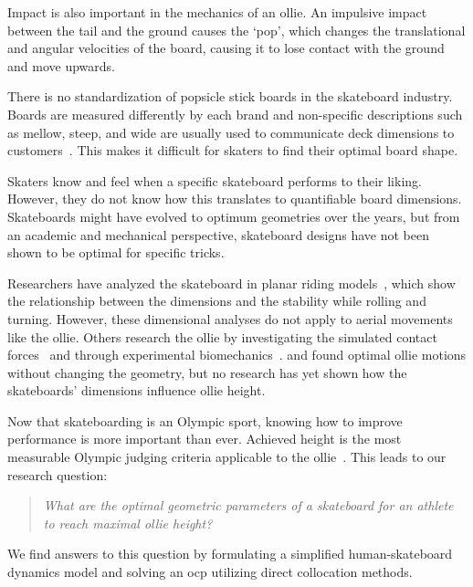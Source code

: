 \documentclass[default,iicol,pdflatex]{sn-jnl}
\begin{document}
Impact is also important in the mechanics of an ollie.
An impulsive impact between the tail and the ground causes the `pop', which changes the translational and angular velocities of the board, causing it to lose contact with the ground and move upwards.

There is no standardization of popsicle stick boards in the skateboard industry.
Boards are measured differently by each brand and non-specific descriptions such as mellow, steep, and wide are usually used to communicate deck dimensions to customers~\cite{berger_handmade_2021}.
This makes it difficult for skaters to find their optimal board shape.

Skaters know and feel when a specific skateboard performs to their liking.
However, they do not know how this translates to quantifiable board dimensions.
Skateboards might have evolved to optimum geometries over the years, but from an academic and mechanical perspective, skateboard designs have not been shown to be optimal for specific tricks.

Researchers have analyzed the skateboard in planar riding models~\cite{hubbard_lateral_1979,kremnev_nonlinear_2010,varszegi_stability_2017}, which show the relationship between the dimensions and the stability while rolling and turning. 
However, these dimensional analyses do not apply to aerial movements like the ollie.
Others research the ollie by investigating the simulated contact forces~\cite{anderson_ollie_2020,shield_contact-implicit_2022} and through experimental biomechanics~\cite{frederick_biomechanics_2006,vorlicek_analysis_2015,wood_3d_2020,candotti_lower_2012,dias_using_2016}.
\citet{shield_contact-implicit_2022} and \citet{anderson_ollie_2020} found optimal ollie motions without changing the geometry, but no research has yet shown how the skateboards' dimensions influence ollie height.

Now that skateboarding is an Olympic sport, knowing how to improve performance is more important than ever.
Achieved height is the most measurable Olympic judging criteria applicable to the ollie~\cite{world_skate_skateboarding_2021}.
This leads to our research question:
\begin{quote}
\textit{What are the optimal geometric parameters of a skateboard for an athlete to reach maximal ollie height?}
\end{quote}
We find answers to this question by formulating a simplified human-skateboard dynamics model and solving an \gls{ocp} utilizing direct collocation methods.
\end{document}
